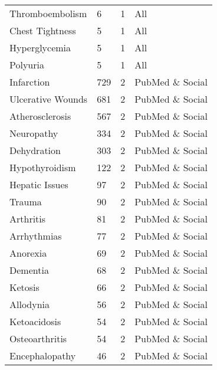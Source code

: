\documentclass[referee,bst/sn-basic]{sn-jnl}%
\begin{document}
\begin{appendices}
\begin{longtable}{llll}
Thromboembolism                          & 6         & 1    & All                     \\
Chest Tightness                          & 5         & 1    & All                     \\
Hyperglycemia                            & 5         & 1    & All                     \\
Polyuria                                 & 5         & 1    & All                     \\
Infarction                               & 729       & 2    & PubMed \& Social        \\
Ulcerative Wounds                        & 681       & 2    & PubMed \& Social        \\
Atherosclerosis                          & 567       & 2    & PubMed \& Social        \\
Neuropathy                               & 334       & 2    & PubMed \& Social        \\
Dehydration                              & 303       & 2    & PubMed \& Social        \\
Hypothyroidism                           & 122       & 2    & PubMed \& Social        \\
Hepatic Issues                           & 97        & 2    & PubMed \& Social        \\
Trauma                                   & 90        & 2    & PubMed \& Social        \\
Arthritis                                & 81        & 2    & PubMed \& Social        \\
Arrhythmias                              & 77        & 2    & PubMed \& Social        \\
Anorexia                                 & 69        & 2    & PubMed \& Social        \\
Dementia                                 & 68        & 2    & PubMed \& Social        \\
Ketosis                                  & 66        & 2    & PubMed \& Social        \\
Allodynia                                & 56        & 2    & PubMed \& Social        \\
Ketoacidosis                             & 54        & 2    & PubMed \& Social        \\
Osteoarthritis                           & 54        & 2    & PubMed \& Social        \\
Encephalopathy                           & 46        & 2    & PubMed \& Social        \\

\end{longtable}
\end{appendices}
\end{document}
